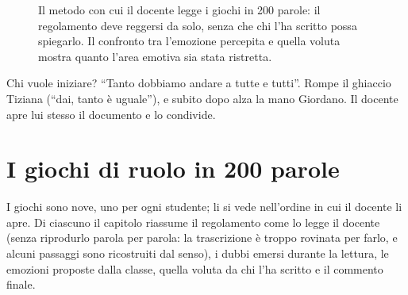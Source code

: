 \begin{figure}[htbp]
\centering
{}
\caption{Il metodo con cui il docente legge i giochi in 200 parole: il regolamento
deve reggersi da solo, senza che chi l'ha scritto possa spiegarlo. Il confronto
tra l'emozione percepita e quella voluta mostra quanto l'area emotiva sia stata
ristretta.}
\label{a6:fig:metodo}
\end{figure}

Chi vuole iniziare? ``Tanto dobbiamo andare a tutte e tutti''. Rompe il ghiaccio
Tiziana (``dai, tanto è uguale''), e subito dopo alza la mano Giordano. Il docente
apre lui stesso il documento e lo condivide.

\section{I giochi di ruolo in 200 parole}
\label{a6:sec:giochi}

I giochi sono nove, uno per ogni studente; li si vede nell'ordine in cui il docente
li apre. Di ciascuno il capitolo riassume il regolamento come lo legge il docente
(senza riprodurlo parola per parola: la trascrizione è troppo rovinata per farlo, e
alcuni passaggi sono ricostruiti dal senso), i dubbi emersi durante la lettura, le
emozioni proposte dalla classe, quella voluta da chi l'ha scritto e il commento
finale.

